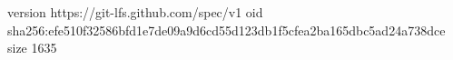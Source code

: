 version https://git-lfs.github.com/spec/v1
oid sha256:efe510f32586bfd1e7de09a9d6cd55d123db1f5cfea2ba165dbc5ad24a738dce
size 1635
